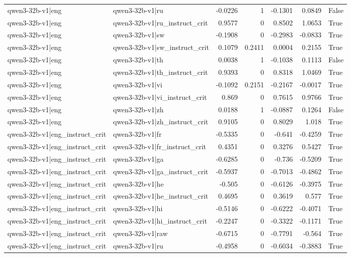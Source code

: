 \begin{table}
\begin{tabular}{l l r r r r l}
qwen3-32b-v1|eng & qwen3-32b-v1|ru & -0.0226 & 1 & -0.1301 & 0.0849 & False \\
qwen3-32b-v1|eng & qwen3-32b-v1|ru_instruct_crit & 0.9577 & 0 & 0.8502 & 1.0653 & True \\
qwen3-32b-v1|eng & qwen3-32b-v1|sw & -0.1908 & 0 & -0.2983 & -0.0833 & True \\
qwen3-32b-v1|eng & qwen3-32b-v1|sw_instruct_crit & 0.1079 & 0.2411 & 0.0004 & 0.2155 & True \\
qwen3-32b-v1|eng & qwen3-32b-v1|th & 0.0038 & 1 & -0.1038 & 0.1113 & False \\
qwen3-32b-v1|eng & qwen3-32b-v1|th_instruct_crit & 0.9393 & 0 & 0.8318 & 1.0469 & True \\
qwen3-32b-v1|eng & qwen3-32b-v1|vi & -0.1092 & 0.2151 & -0.2167 & -0.0017 & True \\
qwen3-32b-v1|eng & qwen3-32b-v1|vi_instruct_crit & 0.869 & 0 & 0.7615 & 0.9766 & True \\
qwen3-32b-v1|eng & qwen3-32b-v1|zh & 0.0188 & 1 & -0.0887 & 0.1264 & False \\
qwen3-32b-v1|eng & qwen3-32b-v1|zh_instruct_crit & 0.9105 & 0 & 0.8029 & 1.018 & True \\
qwen3-32b-v1|eng_instruct_crit & qwen3-32b-v1|fr & -0.5335 & 0 & -0.641 & -0.4259 & True \\
qwen3-32b-v1|eng_instruct_crit & qwen3-32b-v1|fr_instruct_crit & 0.4351 & 0 & 0.3276 & 0.5427 & True \\
qwen3-32b-v1|eng_instruct_crit & qwen3-32b-v1|ga & -0.6285 & 0 & -0.736 & -0.5209 & True \\
qwen3-32b-v1|eng_instruct_crit & qwen3-32b-v1|ga_instruct_crit & -0.5937 & 0 & -0.7013 & -0.4862 & True \\
qwen3-32b-v1|eng_instruct_crit & qwen3-32b-v1|he & -0.505 & 0 & -0.6126 & -0.3975 & True \\
qwen3-32b-v1|eng_instruct_crit & qwen3-32b-v1|he_instruct_crit & 0.4695 & 0 & 0.3619 & 0.577 & True \\
qwen3-32b-v1|eng_instruct_crit & qwen3-32b-v1|hi & -0.5146 & 0 & -0.6222 & -0.4071 & True \\
qwen3-32b-v1|eng_instruct_crit & qwen3-32b-v1|hi_instruct_crit & -0.2247 & 0 & -0.3322 & -0.1171 & True \\
qwen3-32b-v1|eng_instruct_crit & qwen3-32b-v1|raw & -0.6715 & 0 & -0.7791 & -0.564 & True \\
qwen3-32b-v1|eng_instruct_crit & qwen3-32b-v1|ru & -0.4958 & 0 & -0.6034 & -0.3883 & True \\

\end{tabular}
\end{table}
